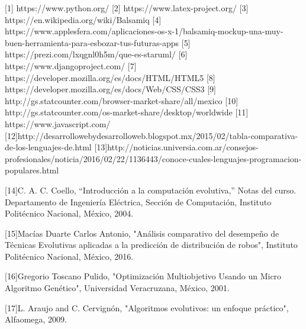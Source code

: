 \label{sec:bibliografia}

		[1] https://www.python.org/
	[2] https://www.latex-project.org/
	[3] https://en.wikipedia.org/wiki/Balsamiq 
	[4] https://www.applesfera.com/aplicaciones-os-x-1/balsamiq-mockup-una-muy-buen-herramienta-para-esbozar-tus-futuras-apps
	[5] https://prezi.com/lxqgnl0h5m/que-es-staruml/
	[6] https://www.djangoproject.com/
	[7] https://developer.mozilla.org/es/docs/HTML/HTML5
	[8] https://developer.mozilla.org/es/docs/Web/CSS/CSS3
	[9] http://gs.statcounter.com/browser-market-share/all/mexico
	[10] http://gs.statcounter.com/os-market-share/desktop/worldwide
	[11] https://www.javascript.com/
	[12]http://desarrollowebydesarrolloweb.blogspot.mx/2015/02/tabla-comparativa-de-los-lenguajes-de.html
	[13]http://noticias.universia.com.ar/consejos-profesionales/noticia/2016/02/22/1136443/conoce-cuales-lenguajes-programacion-populares.html
	
		[14]C. A. C. Coello, “Introducción a la computación evolutiva,” Notas del curso. Departamento de Ingeniería Eléctrica, Sección de Computación, Instituto Politécnico Nacional, México, 2004.

		[15]Macías Duarte Carlos Antonio, "Análisis comparativo del desempeño de Técnicas Evolutivas aplicadas a la predicción de distribución de robos", Instituto Politécnico Nacional, México, 2016.

		[16]Gregorio Toscano Pulido, "Optimización Multiobjetivo Usando un Micro Algoritmo Genético", Universidad Veracruzana, México, 2001.
		
		[17]L. Araujo and C. Cervignón, "Algoritmos evolutivos: un enfoque práctico", Alfaomega, 2009.